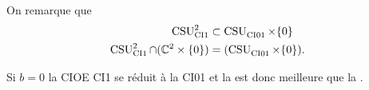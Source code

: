     On remarque que
    \begin{align}
      \CSU[2]{CI1} & \subset \CSU{CI01}\times\lbrace0\rbrace
      \\
      \CSU[2]{CI1}\cap(\CC^2 \times \lbrace0\rbrace) &= (\CSU{CI01}\times\lbrace0\rbrace).
    \end{align}

    Si \(b=0\) la CIOE CI1 se réduit à la CI01 et la  est donc meilleure que la  .

